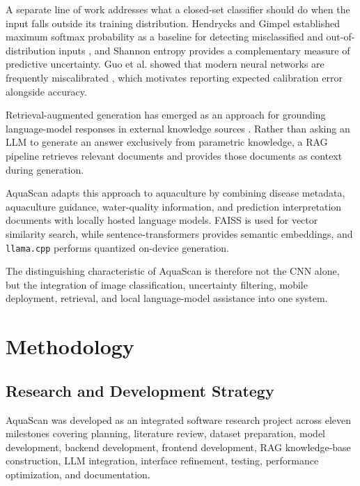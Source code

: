 \documentclass[conference]{IEEEtran}
\begin{document}
A separate line of work addresses what a closed-set classifier should do when the input falls outside its training distribution. Hendrycks and Gimpel established maximum softmax probability as a baseline for detecting misclassified and out-of-distribution inputs \cite{b25}, and Shannon entropy \cite{b24} provides a complementary measure of predictive uncertainty. Guo et al. showed that modern neural networks are frequently miscalibrated \cite{b23}, which motivates reporting expected calibration error alongside accuracy.

Retrieval-augmented generation has emerged as an approach for grounding language-model responses in external knowledge sources \cite{b4}. Rather than asking an LLM to generate an answer exclusively from parametric knowledge, a RAG pipeline retrieves relevant documents and provides those documents as context during generation.

AquaScan adapts this approach to aquaculture by combining disease metadata, aquaculture guidance, water-quality information, and prediction interpretation documents with locally hosted language models. FAISS \cite{b6} is used for vector similarity search, while sentence-transformers \cite{b5} provides semantic embeddings, and \texttt{llama.cpp} \cite{b13} performs quantized on-device generation.

The distinguishing characteristic of AquaScan is therefore not the CNN alone, but the integration of image classification, uncertainty filtering, mobile deployment, retrieval, and local language-model assistance into one system.



\section{Methodology}

\subsection{Research and Development Strategy}

AquaScan was developed as an integrated software research project across eleven milestones covering planning, literature review, dataset preparation, model development, backend development, frontend development, RAG knowledge-base construction, LLM integration, interface refinement, testing, performance optimization, and documentation.
\end{document}
